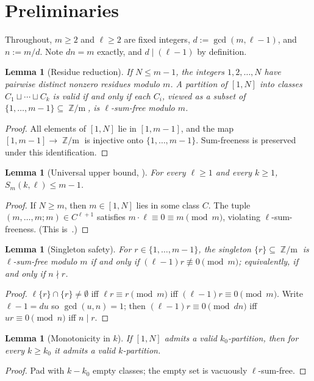 \documentclass[11pt]{amsart}
\theoremstyle{plain}
\newtheorem{lemma}[theorem]{Lemma}
\theoremstyle{definition}
\DeclareMathOperator{\Zm}{\mathbb{Z}/m}
\newcommand{\Sm}{S_m(k,\ell)}
\begin{document}
\section{Preliminaries}\label{sec:prelim}

Throughout, $m\ge 2$ and $\ell\ge 2$ are fixed integers, $d := \gcd(m,\ell-1)$, and $n := m/d$. Note $dn = m$ exactly, and $d\mid (\ell-1)$ by definition.

\begin{lemma}[Residue reduction]\label{lem:residues}
If $N\le m-1$, the integers $1,2,\ldots,N$ have pairwise distinct nonzero residues modulo $m$. A partition of $[1,N]$ into classes $C_1\sqcup\cdots\sqcup C_k$ is valid if and only if each $C_i$, viewed as a subset of $\{1,\ldots,m-1\}\subseteq\Zm$, is $\ell$-sum-free modulo $m$.
\end{lemma}
\begin{proof}
All elements of $[1,N]$ lie in $[1,m-1]$, and the map $[1,m-1]\to\Zm$ is injective onto $\{1,\ldots,m-1\}$. Sum-freeness is preserved under this identification.
\end{proof}

\begin{lemma}[Universal upper bound, \cite{CMD2013}]\label{lem:univ-upper}
For every $\ell\ge 1$ and every $k\ge 1$, $\Sm \le m - 1$.
\end{lemma}
\begin{proof}
If $N\ge m$, then $m\in[1,N]$ lies in some class $C$. The tuple $(m,\ldots,m;m)\in C^{\ell+1}$ satisfies $m\cdot\ell\equiv 0\equiv m\pmod m$, violating $\ell$-sum-freeness. (This is~\cite[Eq.~(2)]{CMD2013}.)
\end{proof}

\begin{lemma}[Singleton safety]\label{lem:singleton}
For $r\in\{1,\ldots,m-1\}$, the singleton $\{r\}\subseteq\Zm$ is $\ell$-sum-free modulo $m$ if and only if $(\ell-1)r\not\equiv 0\pmod m$; equivalently, if and only if $n\nmid r$.
\end{lemma}
\begin{proof}
$\ell\{r\}\cap\{r\}\ne\emptyset$ iff $\ell r\equiv r\pmod m$ iff $(\ell-1)r\equiv 0\pmod m$. Write $\ell-1 = du$ so $\gcd(u,n)=1$; then $(\ell-1)r\equiv 0\pmod{dn}$ iff $ur\equiv 0\pmod n$ iff $n\mid r$.
\end{proof}

\begin{lemma}[Monotonicity in $k$]\label{lem:monotone}
If $[1,N]$ admits a valid $k_0$-partition, then for every $k\ge k_0$ it admits a valid $k$-partition.
\end{lemma}
\begin{proof}
Pad with $k-k_0$ empty classes; the empty set is vacuously $\ell$-sum-free.
\end{proof}
\end{document}
